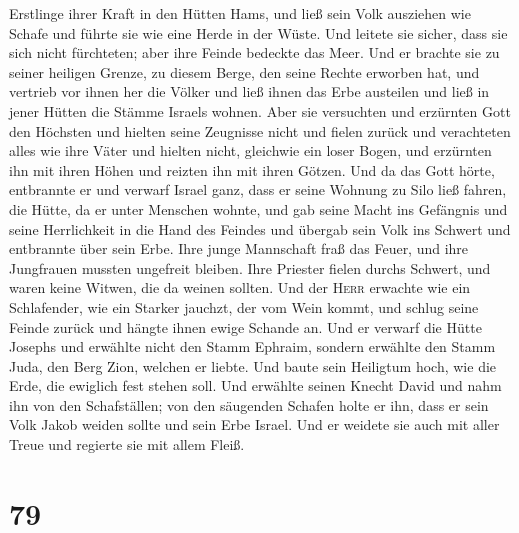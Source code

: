 Erstlinge ihrer Kraft in den Hütten Hams,  und ließ sein
Volk ausziehen wie Schafe und führte sie wie eine Herde in der Wüste.
 Und leitete sie sicher, dass sie sich nicht fürchteten;
aber ihre Feinde bedeckte das Meer.  Und er brachte sie
zu seiner heiligen Grenze, zu diesem Berge, den seine Rechte erworben
hat,  und vertrieb vor ihnen her die Völker und ließ
ihnen das Erbe austeilen und ließ in jener Hütten die Stämme Israels
wohnen.  Aber sie versuchten und erzürnten Gott den
Höchsten und hielten seine Zeugnisse nicht  und fielen
zurück und verachteten alles wie ihre Väter und hielten nicht, gleichwie
ein loser Bogen,  und erzürnten ihn mit ihren Höhen und
reizten ihn mit ihren Götzen.  Und da das Gott hörte,
entbrannte er und verwarf Israel ganz,  dass er seine
Wohnung zu Silo ließ fahren, die Hütte, da er unter Menschen wohnte,
 und gab seine Macht ins Gefängnis und seine Herrlichkeit
in die Hand des Feindes  und übergab sein Volk ins
Schwert und entbrannte über sein Erbe.  Ihre junge
Mannschaft fraß das Feuer, und ihre Jungfrauen mussten ungefreit
bleiben.  Ihre Priester fielen durchs Schwert, und waren
keine Witwen, die da weinen sollten.  Und der
\textsc{Herr} erwachte wie ein Schlafender, wie ein Starker jauchzt, der
vom Wein kommt,  und schlug seine Feinde zurück und
hängte ihnen ewige Schande an.  Und er verwarf die Hütte
Josephs und erwählte nicht den Stamm Ephraim,  sondern
erwählte den Stamm Juda, den Berg Zion, welchen er liebte.
 Und baute sein Heiligtum hoch, wie die Erde, die
ewiglich fest stehen soll.  Und erwählte seinen Knecht
David und nahm ihn von den Schafställen;  von den
säugenden Schafen holte er ihn, dass er sein Volk Jakob weiden sollte
und sein Erbe Israel.  Und er weidete sie auch mit aller
Treue und regierte sie mit allem Fleiß.

\hypertarget{section-78}{%
\section{79}\label{section-78}}

